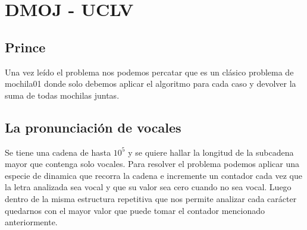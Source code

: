\section{DMOJ - UCLV}
\subsection{Prince} Una vez leído el problema nos podemos percatar que es un clásico problema de mochila01 donde solo debemos aplicar el algoritmo para cada caso y devolver la suma de todas mochilas juntas. 

\subsection{La pronunciación de vocales} Se tiene una cadena de hasta $10^{5}$ y se quiere hallar la longitud de la subcadena mayor que contenga solo vocales. Para resolver el problema podemos aplicar una especie de dinamica que recorra la cadena e incremente un contador cada vez que la letra analizada sea vocal y que su valor sea cero cuando no sea vocal. Luego dentro de la misma estructura repetitiva que nos permite analizar cada carácter quedarnos con el mayor valor que puede tomar el contador mencionado anteriormente. 

